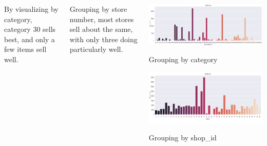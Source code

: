 \documentclass{tikzposter} %
\begin{document}
\begin{columns}
{        \item By visualizing by category, category 30 sells best, and only a few items sell well.
    
        \item Grouping by store number, most stores sell about the same, with only three doing particularly well.
    

\begin{center}
    \begin{minipage}{0.8\linewidth}
    \centering
    \begin{tikzfigure}%
        \includegraphics[width=0.8\linewidth]{figures/catg.png}
    
       \end{tikzfigure}%
       {\small{Grouping by category}}
    \end{minipage}
    \hfill
    \begin{minipage}{0.8\linewidth}
        \centering
        \begin{tikzfigure}%
            \includegraphics[width=0.8\linewidth]{figures/shop.png}
        
           \end{tikzfigure}%
           {\small{Grouping by shop\_id}}
        \end{minipage}
    
\end{center}

}
\end{columns}
\end{document}
